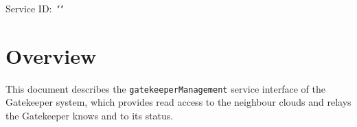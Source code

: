 \documentclass[a4paper]{arrowhead}
\begin{document}
\sloppy

\ArrowheadSetup

\begin{center}
  \vspace*{1cm}
  \huge{\arrowtitle}

  \vspace*{0.2cm}
  \LARGE{\arrowtype}
  \vspace*{1cm}

  \Large{Service ID: \textit{"\arrowid"}}

  \vspace*{\fill}


  \vspace*{1cm}
  \vspace*{\fill}

  \begin{abstract}
    This document describes the HTTP/1.1 protocol with TLS payload security and JSON payload encoding variant of the \texttt{gatekeeper\allowbreak{}Management} service of the Gatekeeper system.
  \end{abstract}

  \vspace*{1cm}
\end{center}

\newpage

\tableofcontents
\newpage

\section{Overview}
\label{sec:overview}

This document describes the \texttt{gatekeeper\allowbreak{}Management} service interface of the Gatekeeper system, which provides read access to the neighbour clouds and relays the Gatekeeper knows and to its status.
\end{document}
